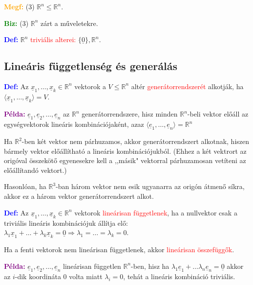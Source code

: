 \documentclass[../szamtud.tex]{subfiles}
\begin{document}
        \textcolor{orange}{\textbf{Megf:}} (3) $\mathbb{R}^n \leq \mathbb{R}^n$. 

        \textcolor{green}{\textbf{Biz:}} (3) $\mathbb{R}^n$ zárt a műveletekre.

        \textcolor{blue}{\textbf{Def:}} $\mathbb{R}^n$ \textcolor{red}{triviális alterei:} $\{\underline{0}\}, \mathbb{R}^n$.

    \subsection{Lineáris függetlenség és generálás}

        \textcolor{blue}{\textbf{Def:}} Az $\underline{x}_1, \dots, \underline{x}_k \in \mathbb{R}^n$ vektorok a $V \leq \mathbb{R}^n$ altér \textcolor{red}{generátorrendszerét} alkotják, ha $\langle \underline{x}_1, \dots, \underline{x}_k \rangle = V$.

        \sloppy \textcolor{purple}{\textbf{Példa:}} $\underline{e}_1, \underline{e}_2, \dots, \underline{e}_n$ az $\mathbb{R}^n$ generátorrendszere, hisz minden $\mathbb{R}^n$-beli vektor előáll az egységvektorok lineáris kombinációjaként, azaz $\langle \underline{e}_1, \dots, \underline{e}_n \rangle = \mathbb{R}^n$

        Ha $\mathbb{R}^2$-ben két vektor nem párhuzamos, akkor generátorrendszert alkotnak, hiszen bármely vektor előállítható a lineáris kombinációjukból. (Ehhez a két vektrort az origóval összekötő egyenesekre kell a ,,másik" vektorral párhuzamosan vetíteni az előállítandó vektort.)

        Hasonlóan, ha $\mathbb{R}^3$-ban három vektor nem esik ugyanarra az origón átmenő síkra, akkor ez a három vektor generátorrendszert alkot.

        \textcolor{blue}{\textbf{Def:}} Az $\underline{x}_1, \dots, \underline{x}_k \in \mathbb{R}^n$ vektorok \textcolor{red}{lineárisan függetlenek}, ha a nullvektor csak a triviális lineáris kombinációjuk állítja elő: $\lambda_1 \underline{x}_1 + \dots + \lambda_k \underline{x}_k = \underline{0} \Rightarrow \lambda_1 = \dots = \lambda_k = 0$.

        Ha a fenti vektorok nem lineárisan függetlenek, akkor \textcolor{red}{lineárisan összefüggők}.

        \textcolor{purple}{\textbf{Példa:}} $\underline{e}_1, \underline{e}_2, \dots, \underline{e}_n$ lineárisan független $\mathbb{R}^n$-ben, hisz ha $\lambda_1 \underline{e}_1 + \dots \lambda_n \underline{e}_n = \underline{0}$ akkor az $i$-dik koordináta 0 volta miatt $\lambda_i = 0$, tehát a lineáris kombináció triviális.
\end{document}

